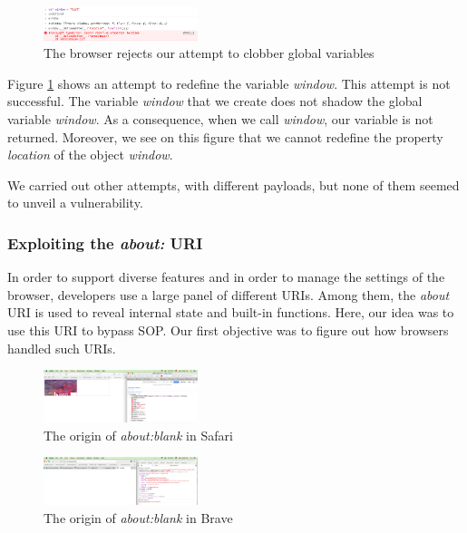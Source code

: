 \documentclass[journal]{IEEEtran}
\begin{document}
\begin{figure}[h]
\centering
\includegraphics[width=0.4\textwidth]{images/clobberingAttempt.png}
\caption{The browser rejects our attempt to clobber global variables}
\label{fig:clobbering}
\end{figure}

Figure \ref{fig:clobbering} shows an attempt to redefine the variable \emph{window}. This attempt is not successful. The variable \emph{window} that we create does not shadow the global variable \emph{window}. As a consequence, when we call \emph{window}, our variable is not returned. Moreover, we see on this figure that we cannot redefine the property \emph{location} of the object \emph{window}.

\medskip

We carried out other attempts, with different payloads, but none of them seemed to unveil a vulnerability.

\subsubsection*{Exploiting the \emph{about:} URI}

In order to support diverse features and in order to manage the settings of the browser, developers use a large panel of different URIs. Among them, the \emph{about} URI is used to reveal internal state and built-in functions. Here, our idea was to use this URI to bypass SOP. Our first objective was to figure out how browsers handled such URIs.

\begin{figure}[h]
\centering
\includegraphics[width=0.4\textwidth]{images/AboutBlankSafari.png}
\caption{The origin of \emph{about:blank} in Safari}
\label{fig:aboutBlankSafari}
\end{figure}

\begin{figure}[h]
\centering
\includegraphics[width=0.4\textwidth]{images/AboutBlankBrave.png}
\caption{The origin of \emph{about:blank} in Brave}
\label{fig:aboutBlankBrave}
\end{figure}
\end{document}
